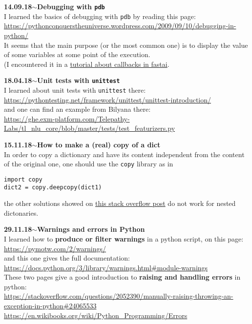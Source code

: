 \documentclass[11pt,a4paper]{article}
\newenvironment{loggentry}[2]%
{\noindent\textbf{#1}\hspace{1cm}$\mathbf{\sim}$\text{ }\textbf{#2}\\}{\vspace{0.5cm}}
\begin{document}
\begin{loggentry}{14.09.18}{Debugging with \texttt{pdb}}
I learned the basics of debugging with \texttt{pdb} by reading this page:\\
\url{https://pythonconquerstheuniverse.wordpress.com/2009/09/10/debugging-in-python/}\\
It seems that the main purpose (or the most common one) is to display the value of some variables at some point of the execution.\\
(I encountered it in a \href{https://github.com/sgugger/Deep-Learning/blob/master/Using%20the%20callback%20system%20in%20fastai.ipynb}{tutorial about callbacks in fastai}.\\
\end{loggentry}

\begin{loggentry}{18.04.18}{Unit tests with \texttt{unittest}}
I learned about unit tests with \texttt{unittest} there:\\
\url{https://pythontesting.net/framework/unittest/unittest-introduction/}\\
and one can find an example from Bilyana there:\\
\url{https://ghe.exm-platform.com/Telepathy-Labs/tl_nlu_core/blob/master/tests/test_featurizers.py}\\
\end{loggentry}

\begin{loggentry}{15.11.18}{How to make a (real) copy of a dict}
In order to copy a dictionary and have its content independent from the content of the original one, one should use the \texttt{copy} library as in
\begin{verbatim}
import copy
dict2 = copy.deepcopy(dict1)
\end{verbatim}
the other solutions showed on \href{https://stackoverflow.com/questions/2465921/how-to-copy-a-dictionary-and-only-edit-the-copy#2465932}{this stack overflow post} do not work for nested dictonaries.
\end{loggentry}

\begin{loggentry}{29.11.18}{Warnings and errors in Python}
I learned how to \textbf{produce or filter warnings} in a python script, on this page:\\
\url{https://pymotw.com/2/warnings/}\\
and this one gives the full documentation:\\
\url{https://docs.python.org/3/library/warnings.html#module-warnings}\\
These two pages give a good introduction to \textbf{raising and handling errors} in python:\\
\url{https://stackoverflow.com/questions/2052390/manually-raising-throwing-an-exception-in-python#24065533}\\
\url{https://en.wikibooks.org/wiki/Python_Programming/Errors}
\end{loggentry}
\end{document}
